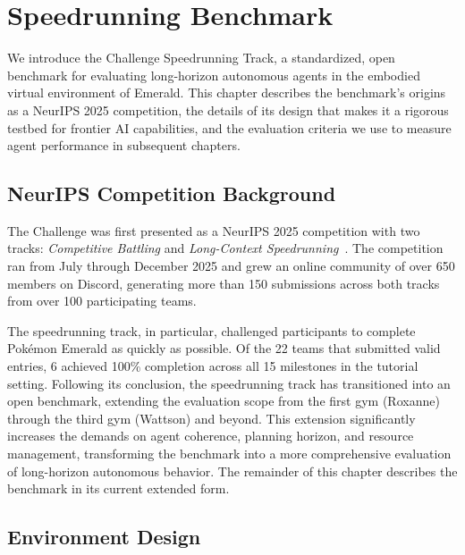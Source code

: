 
\newpage
\section{Speedrunning Benchmark}\label{sec:benchmark}

We introduce the \pokeagent{} Challenge Speedrunning Track, a standardized, open benchmark for evaluating long-horizon autonomous agents in the embodied virtual environment of \pokemon{} Emerald. This chapter describes the benchmark's origins as a NeurIPS 2025 competition, the details of its design that makes it a rigorous testbed for frontier AI capabilities, and the evaluation criteria we use to measure agent performance in subsequent chapters.

\subsection{NeurIPS Competition Background}\label{sec:neurips_background}

The \pokeagent{} Challenge was first presented as a NeurIPS 2025 competition with two tracks: \emph{Competitive Battling} and \emph{Long-Context Speedrunning}~\citep{karten2025pokeagent}. The competition ran from July through December 2025 and grew an online community of over 650 members on Discord, generating more than 150 submissions across both tracks from over 100 participating teams. 

The speedrunning track, in particular, challenged participants to complete Pok\'{e}mon Emerald as quickly as possible. Of the 22 teams that submitted valid entries, 6 achieved 100\% completion across all 15 milestones in the tutorial setting. Following its conclusion, the speedrunning track has transitioned into an open benchmark, extending the evaluation scope from the first gym (Roxanne) through the third gym (Wattson) and beyond. This extension significantly increases the demands on agent coherence, planning horizon, and resource management, transforming the benchmark into a more comprehensive evaluation of long-horizon autonomous behavior. The remainder of this chapter describes the benchmark in its current extended form.

\subsection{Environment Design}\label{sec:environment_design}


